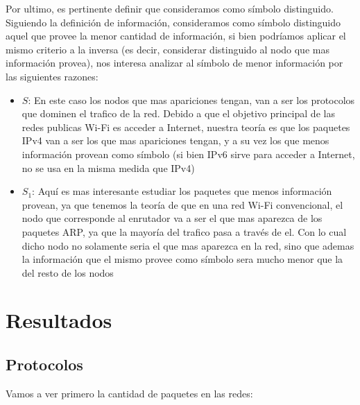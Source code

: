 Por ultimo, es pertinente definir que consideramos como símbolo distinguido. Siguiendo la definición de información, consideramos como símbolo distinguido aquel que provee la menor cantidad de información, si bien podríamos aplicar el mismo criterio a la inversa (es decir, considerar distinguido al nodo que mas información provea), nos interesa analizar al símbolo de menor información por las siguientes razones:

\begin{itemize}
	\item $S$: En este caso los nodos que mas apariciones tengan, van a ser los protocolos que dominen el trafico de la red. Debido a que el objetivo principal de las redes publicas Wi-Fi es acceder a Internet, nuestra teoría es que los paquetes IPv4 van a ser los que mas apariciones tengan, y a su vez los que menos información provean como símbolo (si bien IPv6 sirve para acceder a Internet, no se usa en la misma medida que IPv4)
	\item $S_1$: Aquí es mas interesante estudiar los paquetes que menos información provean, ya que tenemos la teoría de que en una red Wi-Fi convencional, el nodo que corresponde al enrutador va a ser el que mas aparezca de los paquetes ARP, ya que la mayoría del trafico pasa a través de el. Con lo cual dicho nodo no solamente seria el que mas aparezca en la red, sino que ademas la información que el mismo provee como símbolo sera mucho menor que la del resto de los nodos
\end{itemize}


\section{Resultados}

\subsection{Protocolos}

Vamos a ver primero la cantidad de paquetes en las redes:

